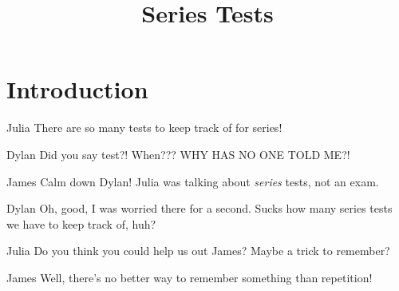 \documentclass{ximera}
\title{Series Tests}
\begin{document}
\section{Introduction}
\begin{dialogue}
\item[Julia] There are so many tests to keep track of for series!
\item[Dylan] Did you say test?! When??? WHY HAS NO ONE TOLD ME?!
\item[James] Calm down Dylan! Julia was talking about \textit{series} tests, not an exam.
\item[Dylan] Oh, good, I was worried there for a second. Sucks how many series tests we have to keep track of, huh?
\item[Julia] Do you think you could help us out James? Maybe a trick to remember?
\item[James] Well, there's no better way to remember something than repetition!
\end{dialogue}
\end{document}
